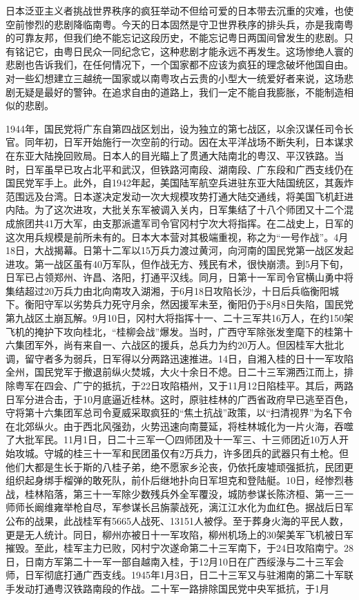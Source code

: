 日本泛亚主义者挑战世界秩序的疯狂举动不但给可爱的日本带去沉重的灾难，也使空前惨烈的悲剧降临南粤。今天的日本固然是守卫世界秩序的排头兵，亦是我南粤的可靠友邦，但我们绝不能忘记这段历史，不能忘记粤日两国间曾发生的悲剧。只有铭记它，由粤日民众一同纪念它，这种悲剧才能永远不再发生。这场惨绝人寰的悲剧也告诉我们，在任何情况下，一个国家都不应该为疯狂的理念破坏他国自由。对一些幻想建立三越统一国家或以南粤攻占云贵的小型大一统爱好者来说，这场悲剧无疑是最好的警钟。在追求自由的道路上，我们一定不能自我膨胀，不能制造相似的悲剧。

1944年，国民党将广东自第四战区划出，设为独立的第七战区，以余汉谋任司令长官。同年初，日军开始施行一次空前的行动。因在太平洋战场不断失利，日本谋求在东亚大陆挽回败局。日本人的目光瞄上了贯通大陆南北的粤汉、平汉铁路。当时，日军虽早已攻占北平和武汉，但铁路河南段、湖南段、广东段和广西支线仍在国民党军手上。此外，自1942年起，美国陆军航空兵进驻东亚大陆国统区，其轰炸范围远及台湾。日本遂决定发动一次大规模攻势打通大陆交通线，将美国飞机赶进内陆。为了这次进攻，大批关东军被调入关内，日军集结了十八个师团又十二个混成旅团共41万大军，由支那派遣军司令官冈村宁次大将指挥。在二战史上，日军的这次用兵规模是前所未有的。日本大本营对其极端重视，称之为“一号作战”。4月18日，大战揭幕。日第十二军以15万兵力渡过黄河，向河南的国民党第一战区发起进攻。第一战区虽有40万军队，但作战无方、残民有术，很快崩溃。到5月下旬，日军已占领郑州、许昌、洛阳，打通平汉线。同月，日第十一军司令官横山勇中将集结超过20万兵力由北向南攻入湖湘，于6月18日攻陷长沙，十日后兵临衡阳城下。衡阳守军以劣势兵力死守月余，然因援军未至，衡阳仍于8月8日失陷，国民党第九战区土崩瓦解。9月10日，冈村大将指挥十一、二十三军共16万人，在约150架飞机的掩护下攻向桂北，“桂柳会战”爆发。当时，广西守军除张发奎麾下的桂第十六集团军外，尚有来自一、六战区的援兵，总兵力为约20万人。但因桂军大批北调，留守者多为弱兵，日军得以分两路迅速推进。14日，自湘入桂的日十一军攻陷全州，国民党军于撤退前纵火焚城，大火十余日不熄。日二十三军溯西江而上，排除粤军在四会、广宁的抵抗，于22日攻陷梧州，又于11月12日陷桂平。其后，两路日军分进合击，于10月底逼近桂林。这时，原驻桂林的广西省政府早已逃至百色，守将第十六集团军总司令夏威采取疯狂的“焦土抗战”政策，以“扫清视界”为名下令在北郊纵火。由于西北风强劲，火势迅速向南蔓延，将桂林城化为一片火海，吞噬了大批军民。11月1日，日二十三军一〇四师团及十一军三、十三师团近10万人开始攻城。守城的桂三十一军和民团虽仅有2万兵力，许多团兵的武器只有土枪。但他们大都是生长于斯的八桂子弟，绝不愿家乡沦丧，仍依托废墟顽强抵抗，民团更组织起身绑手榴弹的敢死队，前仆后继地扑向日军坦克和登陆艇。10日，经惨烈巷战，桂林陷落，第三十一军除少数残兵外全军覆没，城防参谋长陈济桓、第一三一师师长阚维雍举枪自尽，军参谋长吕旃蒙战死，漓江江水化为血红色。据战后日军公布的战果，此战桂军有5665人战死、13151人被俘。至于葬身火海的平民人数，更是无人统计。同日，柳州亦被日十一军攻陷，柳州机场上的30架美军飞机被日军摧毁。至此，桂军主力已败，冈村宁次遂命第二十三军南下，于24日攻陷南宁。28日，日南方军第二十一军一部自越南入桂，于12月10日在广西绥淥与二十三军会师，日军彻底打通广西支线。1945年1月3日，日二十三军又与驻湘南的第二十军联手发动打通粤汉铁路南段的作战。二十军一路排除国民党中央军抵抗，于1月